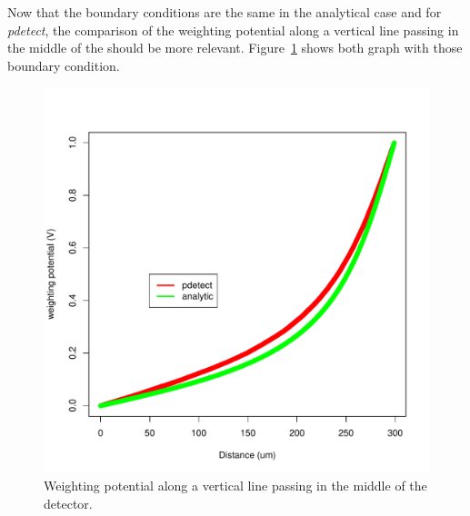 \documentclass[11pt]{article}
\begin{document}
			Now that the boundary conditions are the same in the analytical case and for \textit{pdetect},
			the comparison of the weighting potential along a vertical line passing in the middle of the
			should be more relevant. Figure~\ref{fig:semi_free_conditions} shows both graph with those boundary
			condition.

			\begin{figure}[H]
				\begin{minipage}[b]{.46\linewidth}
					\center
					\includegraphics[scale=0.45]{images/boundary_conditions/semi-free.pdf}
					\caption{Weighting potential along a vertical line passing in the middle of the detector.}
					\label{fig:semi_free_conditions}
				\end{minipage} \hfill
				\begin{minipage}[b]{.46\linewidth}
					\center

\end{minipage}
\end{figure}
\end{document}
